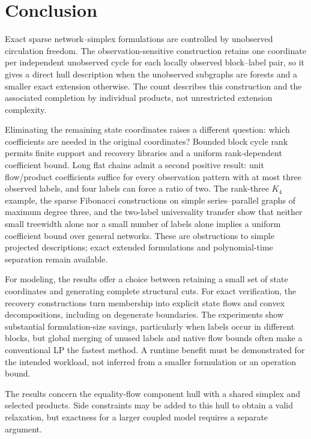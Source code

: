 \section{Conclusion}\label{sec:conclusion}
Exact sparse network--simplex formulations are controlled by unobserved
circulation freedom. The observation-sensitive construction retains one
coordinate per independent unobserved cycle for each locally observed
block--label pair, so it gives a direct hull description when the unobserved
subgraphs are forests and a smaller exact extension otherwise. The count
describes this construction and the associated completion by individual
products, not unrestricted extension complexity.

Eliminating the remaining state coordinates raises a different question:
which coefficients are needed in the original coordinates? Bounded block
cycle rank permits finite support and recovery libraries and a uniform
rank-dependent coefficient bound. Long flat chains admit a second positive
result: unit flow/product coefficients suffice for every observation pattern
with at most three observed labels, and four labels can force a ratio of
two. The rank-three $K_4$ example, the sparse Fibonacci constructions on
simple series--parallel graphs of maximum degree three, and the two-label
universality transfer show that neither small treewidth alone nor a small
number of labels alone implies a uniform coefficient bound over general
networks. These are obstructions to simple projected descriptions; exact
extended formulations and polynomial-time separation remain available.

For modeling, the results offer a choice between retaining a small set of
state coordinates and generating complete structural cuts. For exact
verification, the recovery constructions turn membership into explicit
state flows and convex decompositions, including on degenerate boundaries.
The experiments show substantial formulation-size savings, particularly when
labels occur in different blocks, but global merging of unused labels and
native flow bounds often make a conventional LP the fastest method. A runtime
benefit must be demonstrated for the intended workload, not inferred from a
smaller formulation or an operation bound.

The results concern the equality-flow component hull with a shared simplex
and selected products. Side constraints may be added to this hull to obtain
a valid relaxation, but exactness for a larger coupled model requires a
separate argument.
